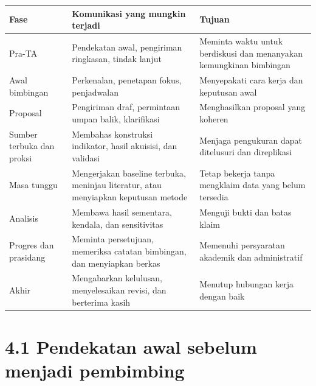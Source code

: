 \documentclass[
  indonesian,
]{article}
\newcounter{none} %
\renewcommand{\subsection}{\section}
\begin{document}
{\def\LTcaptype{none} %
\begin{longtable}[]{@{}
  >{\raggedright\arraybackslash}p{}
  >{\raggedright\arraybackslash}p{}
  >{\raggedright\arraybackslash}p{}@{}}
\toprule\noalign{}
\begin{minipage}[b]{\linewidth}\raggedright
Fase
\end{minipage} & \begin{minipage}[b]{\linewidth}\raggedright
Komunikasi yang mungkin terjadi
\end{minipage} & \begin{minipage}[b]{\linewidth}\raggedright
Tujuan
\end{minipage} \\
\midrule\noalign{}
\endhead
\bottomrule\noalign{}
\endlastfoot
Pra-TA & Pendekatan awal, pengiriman ringkasan, tindak lanjut & Meminta
waktu untuk berdiskusi dan menanyakan kemungkinan bimbingan \\
Awal bimbingan & Perkenalan, penetapan fokus, penjadwalan & Menyepakati
cara kerja dan keputusan awal \\
Proposal & Pengiriman draf, permintaan umpan balik, klarifikasi &
Menghasilkan proposal yang koheren \\
Sumber terbuka dan proksi & Membahas konstruksi indikator, hasil
akuisisi, dan validasi & Menjaga pengukuran dapat ditelusuri dan
direplikasi \\
Masa tunggu & Mengerjakan baseline terbuka, meninjau literatur, atau
menyiapkan keputusan metode & Tetap bekerja tanpa mengklaim data yang
belum tersedia \\
Analisis & Membawa hasil sementara, kendala, dan sensitivitas & Menguji
bukti dan batas klaim \\
Progres dan prasidang & Meminta persetujuan, memeriksa catatan
bimbingan, dan menyiapkan berkas & Memenuhi persyaratan akademik dan
administratif \\
Akhir & Mengabarkan kelulusan, menyelesaikan revisi, dan berterima kasih
& Menutup hubungan kerja dengan baik \\
\end{longtable}
}

\subsection{4.1 Pendekatan awal sebelum menjadi
pembimbing}\label{pendekatan-awal-sebelum-menjadi-pembimbing}
\end{document}
